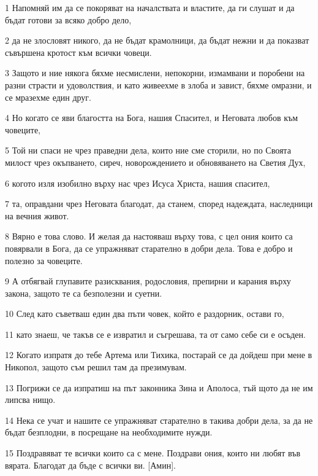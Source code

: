 \par 1 Напомняй им да се покоряват на началствата и властите, да ги слушат и да бъдат готови за всяко добро дело,
\par 2 да не злословят никого, да не бъдат крамолници, да бъдат нежни и да показват съвършена кротост към всички човеци.
\par 3 Защото и ние някога бяхме несмислени, непокорни, измамвани и поробени на разни страсти и удоволствия, и като живеехме в злоба и завист, бяхме омразни, и се мразехме един друг.
\par 4 Но когато се яви благостта на Бога, нашия Спасител, и Неговата любов към човеците,
\par 5 Той ни спаси не чрез праведни дела, които ние сме сторили, но по Своята милост чрез окъпването, сиреч, новорождението и обновяването на Светия Дух,
\par 6 когото изля изобилно върху нас чрез Исуса Христа, нашия спасител,
\par 7 та, оправдани чрез Неговата благодат, да станем, според надеждата, наследници на вечния живот.
\par 8 Вярно е това слово. И желая да настояваш върху това, с цел ония които са повярвали в Бога, да се упражняват старателно в добри дела. Това е добро и полезно за човеците.
\par 9 А отбягвай глупавите разисквания, родословия, препирни и карания върху закона, защото те са безполезни и суетни.
\par 10 След като съветваш един два пъти човек, който е раздорник, остави го,
\par 11 като знаеш, че такъв се е извратил и съгрешава, та от само себе си е осъден.
\par 12 Когато изпратя до тебе Артема или Тихика, постарай се да дойдеш при мене в Никопол, защото съм решил там да презимувам.
\par 13 Погрижи се да изпратиш на път законника Зина и Аполоса, тъй щото да не им липсва нищо.
\par 14 Нека се учат и нашите се упражняват старателно в такива добри дела, за да не бъдат безплодни, в посрещане на необходимите нужди.
\par 15 Поздравяват те всички които са с мене. Поздрави ония, които ни любят във вярата. Благодат да бъде с всички ви. [Амин].

